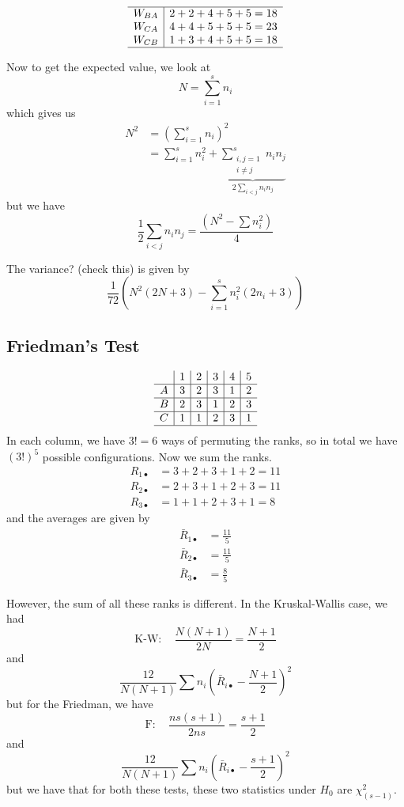 \documentclass[a4paper,12pt]{amsart}
\begin{document}
\[\begin{array}{c|c}
\hline
W_{BA} & 2 + 2 + 4 + 5 + 5 = 18\\
W_{CA} &4 + 4 + 5 + 5 + 5 = 23 \\
W_{CB} & 1 + 3 + 4 + 5 + 5 =18\\
\hline
\end{array} \]

Now to get the expected value, we look at 
\[N = \sum_{i=1}^s n_i\]
which gives us
\begin{align*}
N^2 &= \left(\sum_{i=1}^s n_i\right)^2\\
&= \sum_{i=1}^s n_i^2 + \underbrace{\sum_{\substack{i,j=1\\i \neq j}}^s n_i n_j}_{\displaystyle 2 \sum_{i < j} n_i n_j}
\end{align*}
but we have
\[\frac{1}{2}\sum_{i<j} n_i n_j = \frac{(N^2 - \sum n_i^2)}{4}\]


The variance? (check this) is given by
\[\frac{1}{72}\left(N^2(2N+3) - \sum_{i=1}^s n_i^2 (2n_i+3)\right)\]

\subsection{Friedman's Test}

\[\begin{array}{c|c|c|c|c|c}
 & 1 & 2 & 3 & 4 & 5\\
 \hline
A &3 &2 &3 &1 &2\\
\hline
B &2 & 3& 1& 2& 3\\
\hline
C &1 &1 &2 &3 &1\\
\hline
\end{array} \]
In each column, we have $3!=6$ ways of permuting the ranks, so in total we have $(3!)^5$ possible configurations. Now we sum the ranks.
\begin{align*}
R_{1\bullet} &= 3 + 2 + 3 + 1 + 2 = 11\\
R_{2\bullet} &= 2 + 3 + 1 + 2 + 3 = 11\\
R_{3\bullet} &= 1 + 1 + 2 + 3 + 1 = 8
\end{align*}
and the averages are given by
\begin{align*}
\bar{R}_{1\bullet} &= \frac{11}{5}\\
\bar{R}_{2\bullet} &= \frac{11}{5}\\
\bar{R}_{3\bullet} &= \frac{8}{5}
\end{align*}

However, the sum of all these ranks is different. In the Kruskal-Wallis case, we had
\[\text{K-W}: \quad \frac{N(N+1)}{2N} = \frac{N+1}{2}\]
and
\[\frac{12}{N(N+1)} \sum n_i \left(\bar{R}_{i\bullet} - \frac{N+1}{2}\right)^2\]
but for the Friedman, we have
\[\text{F}: \quad \frac{ns(s+1)}{2ns} = \frac{s+1}{2}\]
and 
\[\frac{12}{N(N+1)} \sum n_i \left(\bar{R}_{i\bullet} - \frac{s+1}{2}\right)^2\]
but we have that for both these tests, these two statistics under $H_0$ are $\chi^2_{(s-1)}$.
\end{document}
